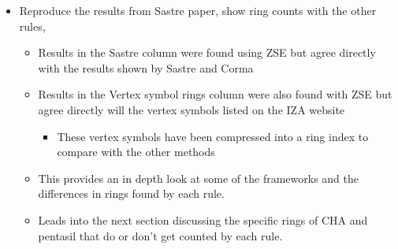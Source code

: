\documentclass[11pt]{article}
\begin{document}
\begin{itemize}
\item Reproduce the results from Sastre paper, show ring counts with the other rules, 
\begin{itemize}
\item Results in the Sastre column were found using ZSE but agree directly with the results shown by Sastre and Corma \cite{sastre-topological-2009}
\item Results in the Vertex symbol rings column were also found with ZSE but agree directly will the vertex symbols listed on the IZA website
\begin{itemize}
\item These vertex symbols have been compressed into a ring index to compare with the other methods
\end{itemize}
\item This provides an in depth look at some of the frameworks and the differences in rings found by each rule.
\item Leads into the next section discussing the specific rings of CHA and pentasil that do or don't get counted by each rule.
\end{itemize}
\end{itemize}
\end{document}
